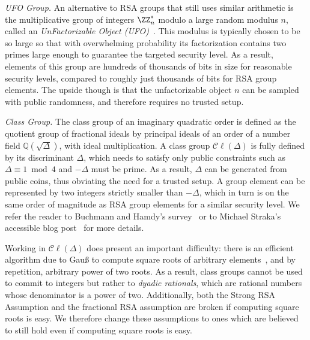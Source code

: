 \documentclass{article}
\theoremstyle{definition}
\begin{document}
\textit{UFO Group.} An alternative to RSA groups that still uses similar arithmetic is the multiplicative group of integers $\ZZ_n^*$ modulo a large random modulus $n$, called an \emph{UnFactorizable Object (UFO)}~\cite{conf/icics/Sander99}. This modulus is typically chosen to be so large so that with overwhelming probability its factorization contains two primes large enough to guarantee the targeted security level. As a result, elements of this group are hundreds of thousands of bits in size for reasonable security levels, compared to roughly just thousands of bits for RSA group elements. The upside though is that the unfactorizable object $n$ can be sampled with public randomness, and therefore requires no trusted setup.

\textit{Class Group.} The class group of an imaginary quadratic order is defined as the quotient group of fractional ideals by principal ideals of an order of a number field $\mathbb{Q}(\sqrt{\Delta})$, with ideal multiplication. A class group $\mathcal{C}\ell(\Delta)$ is fully defined by its discriminant $\Delta$, which needs to satisfy only public constraints such as $\Delta \equiv 1 \bmod 4$ and $-\Delta$ must be prime. As a result, $\Delta$ can be generated from public coins, thus obviating the need for a trusted setup. A group element can be represented by two integers strictly smaller than $-\Delta$, which in turn is on the same order of magnitude as RSA group elements for a similar security level.  We refer the reader to Buchmann and Hamdy's survey~\cite{PKC/BucHam01} or to Michael Straka's accessible blog post~\cite{web/Stra19} for more details.

Working in $\mathcal{C}\ell(\Delta)$ does present an important difficulty: there is an efficient algorithm due to Gauß to compute square roots of arbitrary elements~\cite{jtn/BosSte96}, and by repetition, arbitrary power of two roots. As a result, class groups cannot be used to commit to integers but rather to \emph{dyadic rationals}, which are rational numbers whose denominator is a power of two.
Additionally, both the Strong RSA Assumption and the fractional RSA assumption are broken if computing square roots is easy. We therefore change these assumptions to ones which are believed to still hold even if computing square roots is easy.
\end{document}
